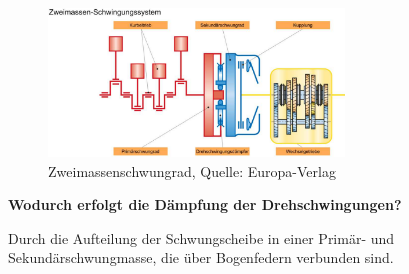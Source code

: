 \begin{figure}[!ht]%
\centering
\includegraphics[width=0.7\textwidth]{images/Kupplung/Kupplung-10.pdf}
\caption{Zweimassenschwungrad, Quelle: Europa-Verlag}
\end{figure}

\textbf{Wodurch erfolgt die Dämpfung der Drehschwingungen?}

Durch die Aufteilung der Schwungscheibe in einer Primär- und
Sekundärschwungmasse, die über Bogenfedern verbunden sind.
